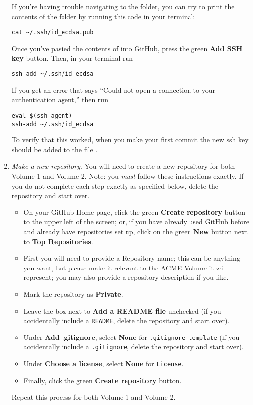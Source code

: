 \begin{enumerate}
    If you're having trouble navigating to the  folder, you can try to print the contents of the folder by running this code in your terminal:
\begin{lstlisting}
cat ~/.ssh/id_ecdsa.pub 
\end{lstlisting}
    Once you've pasted the contents of  into GitHub, press the green \textbf{Add SSH key} button.
    Then, in your terminal run 
\begin{lstlisting}
ssh-add ~/.ssh/id_ecdsa 
\end{lstlisting}
    If you get an error that says ``Could not open a connection to your authentication agent,'' then run 
\begin{lstlisting}
eval $(ssh-agent)
ssh-add ~/.ssh/id_ecdsa 
\end{lstlisting}

    To verify that this worked, when you make your first commit the new ssh key should be added to the file .
  
    \item \emph{Make a new repository}.
    You will need to create a new repository for both Volume 1 and Volume 2.
    Note: you \emph{must} follow these instructions exactly. 
    If you do not complete each step exactly as specified below, delete the repository and start over.
    \begin{itemize}
        \item On your GitHub Home page, click the green \textbf{Create repository} button to the upper left of the screen; or, if you have already used GitHub before and already have repositories set up, click on the green \textbf{New} button next to \textbf{Top Repositories}.
        \item First you will need to provide a Repository name; this can be anything you want, but please make it relevant to the ACME Volume it will represent; you may also provide a repository description if you like.
        \item Mark the repository as \textbf{Private}.
        \item Leave the box next to \textbf{Add a README file} unchecked (if you accidentally include a \texttt{README}, delete the repository and start over).
        \item Under \textbf{Add .gitignore}, select \textbf{None} for \texttt{.gitignore template} (if you accidentally include a \texttt{.gitignore}, delete the repository and start over).
        \item Under \textbf{Choose a license}, select \textbf{None} for \texttt{License}.
        \item Finally, click the green \textbf{Create repository} button.
    \end{itemize}
    Repeat this process for both Volume 1 and Volume 2.
  

\end{enumerate}
